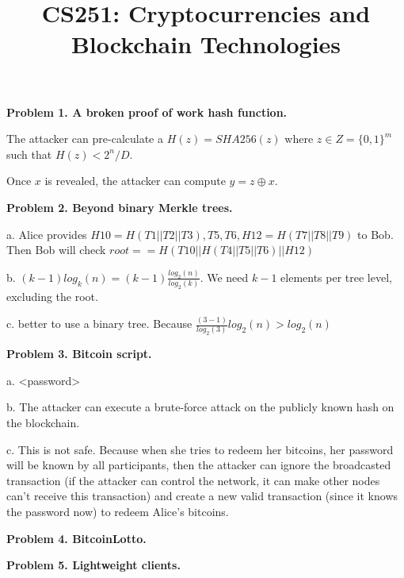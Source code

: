 \documentclass{article}
\title{CS251: Cryptocurrencies and Blockchain Technologies \exerciseset}
\begin{document}
\maketitle 


\textbf{Problem 1. A broken proof of work hash function.}

\vspace{12pt}
 
The attacker can pre-calculate a $H(z) = SHA256(z)$ where $z \in Z = \{0,1\}^m$ such that $H(z) < 2^n / D$.

\par

Once $x$ is revealed, the attacker can compute $y = z \oplus x$.

\vspace{12pt}

\textbf{Problem 2. Beyond binary Merkle trees.}

\vspace{12pt}

a. Alice provides $H10 = H(T1 || T2 || T3), T5, T6, H12 = H(T7||T8||T9)$ to Bob. 
Then Bob will check $root == H(T10 || H(T4||T5||T6) || H12)$

\vspace{6pt}

b. $(k-1) log_k(n) = (k-1) \frac{log_2(n)}{log_2(k)}$. We need $k-1$ elements per tree level, excluding the root.

\vspace{6pt}

c. better to use a binary tree. Because $\frac{(3-1)}{log_2(3)}log_2(n) > log_2(n)$

\vspace{12pt}

\textbf{Problem 3. Bitcoin script.}

\vspace{6pt}

a. <password>

\vspace{6pt}

b. The attacker can execute a brute-force attack on the publicly known hash on the blockchain.

\vspace{6pt}

c. This is not safe. Because when she tries to redeem her bitcoins, her password will be known by all participants, then the attacker can ignore the broadcasted transaction (if the attacker can control the network, it can make other nodes can't receive this transaction) and create a new valid transaction (since it knows the password now) to redeem Alice's bitcoins.

\vspace{12pt}

\textbf{Problem 4. BitcoinLotto.}

\vspace{12pt}

\textbf{Problem 5. Lightweight clients.}

\vspace{12pt}
\end{document}

